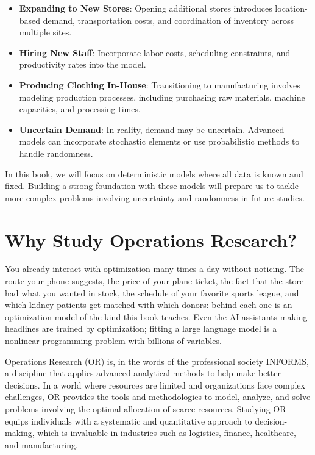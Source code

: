 \begin{itemize}
    \item \textbf{Expanding to New Stores}: Opening additional stores introduces location-based demand, transportation costs, and coordination of inventory across multiple sites.
    \item \textbf{Hiring New Staff}: Incorporate labor costs, scheduling constraints, and productivity rates into the model.
    \item \textbf{Producing Clothing In-House}: Transitioning to manufacturing involves modeling production processes, including purchasing raw materials, machine capacities, and processing times.
    \item \textbf{Uncertain Demand}: In reality, demand may be uncertain. Advanced models can incorporate stochastic elements or use probabilistic methods to handle randomness.
\end{itemize}

In this book, we will focus on deterministic models where all data is known and fixed. Building a strong foundation with these models will prepare us to tackle more complex problems involving uncertainty and randomness in future studies.

\section{Why Study Operations Research?}
\label{sec:why-OR}

You already interact with optimization many times a day without noticing.  The route your phone suggests, the price of your plane ticket, the fact that the store had what you wanted in stock, the schedule of your favorite sports league, and which kidney patients get matched with which donors: behind each one is an optimization model of the kind this book teaches.  Even the AI assistants making headlines are trained by optimization; fitting a large language model is a nonlinear programming problem with billions of variables.

Operations Research (OR) is, in the words of the professional society INFORMS, a discipline that applies advanced analytical methods to help make better decisions. In a world where resources are limited and organizations face complex challenges, OR provides the tools and methodologies to model, analyze, and solve problems involving the optimal allocation of scarce resources. Studying OR equips individuals with a systematic and quantitative approach to decision-making, which is invaluable in industries such as logistics, finance, healthcare, and manufacturing.

